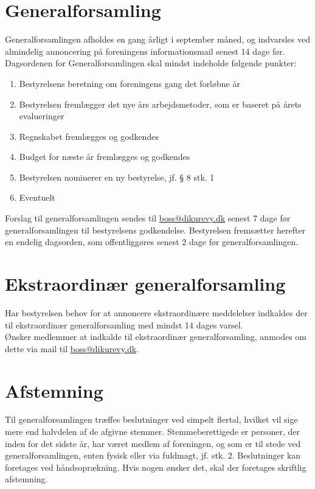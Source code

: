 \documentclass[a4paper,11pt,danish]{article}
\begin{document}
\section{Generalforsamling}
Generalforsamlingen afholdes en gang årligt i september måned, og indvarsles
ved almindelig annoncering på foreningens informationsmail senest 14 dage før.\\

\noindent Dagsordenen for Generalforsamlingen skal mindst indeholde følgende
punkter:

\begin{enumerate}
\item Bestyrelsens beretning om foreningens gang det forløbne år
\item Bestyrelsen fremlægger det nye års arbejdsmetoder, som er baseret på årets
evalueringer
\item Regnskabet fremlægges og godkendes
\item Budget for næste år fremlægges og godkendes
\item Bestyrelsen nominerer en ny bestyrelse, jf. § 8 stk. 1
\item Eventuelt
\end{enumerate}

\noindent Forslag til generalforsamlingen sendes til \url{boss@dikurevy.dk}
senest 7 dage før generalforsamlingen til bestyrelsens godkendelse. Bestyrelsen
fremsætter herefter en endelig dagsorden, som offentliggøres senest 2 dage før
generalforsamlingen.

\section{Ekstraordinær generalforsamling}
Har bestyrelsen behov for at annoncere ekstraordinære meddelelser indkaldes der
til ekstraordinær generalforsamling med mindst 14 dages varsel.\\

\noindent Ønsker medlemmer at indkalde til ekstraordinær generalforsamling,
anmodes om dette via mail til \url{boss@dikurevy.dk}.

\section{Afstemning}
Til generalforsamlingen træffes beslutninger ved simpelt flertal, hvilket
vil sige mere end halvdelen af de afgivne stemmer. Stemmeberettigede er
personer, der inden for det sidste år, har været medlem af foreningen, og som er
til stede ved generalforsamlingen, enten fysisk eller via fuldmagt, jf. stk. 2.
Beslutninger kan foretages ved håndsoprækning. Hvis nogen ønsker det, skal der
foretages skriftlig afstemning.
\end{document}

